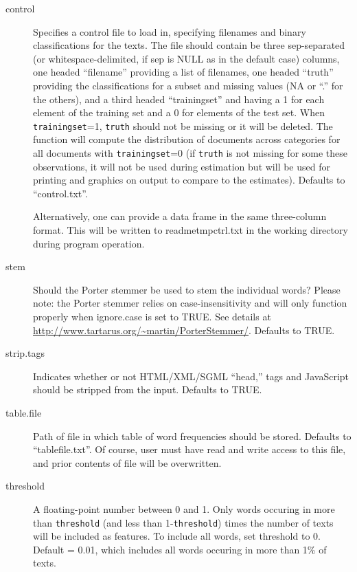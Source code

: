 \documentclass[oneside,letterpaper,titlepage]{article}
\begin{document}
\begin{description}
\item[control] Specifies a control file to load in, specifying
  filenames and binary classifications for the texts. The file should
  contain be three sep-separated (or whitespace-delimited, if sep is
  NULL as in the default case) columns, one headed ``filename''
  providing a list of filenames, one headed ``truth'' providing the
  classifications for a subset and missing values (NA or ``.'' for the
  others), and a third headed ``trainingset'' and having a 1 for each
  element of the training set and a 0 for elements of the test set.
  When \texttt{trainingset}=1, \texttt{truth} should not be missing or
  it will be deleted.  The function will compute the distribution of
  documents across categories for all documents with
  \texttt{trainingset}=0 (if \texttt{truth} is not missing for some
  these observations, it will not be used during estimation but will
  be used for printing and graphics on output to compare to the
  estimates).  Defaults to ``control.txt''.
  
  Alternatively, one can provide a data frame in the same three-column
  format. This will be written to readmetmpctrl.txt in the working
  directory during program operation.
  
\item[stem] Should the Porter stemmer be used to stem the individual
  words? Please note: the Porter stemmer relies on case-insensitivity
  and will only function properly when ignore.case is set to TRUE. See
  details at \url{http://www.tartarus.org/~martin/PorterStemmer/}.
  Defaults to TRUE.

\item[strip.tags] Indicates whether or not HTML/XML/SGML ``head,''
  tags and JavaScript should be stripped from the input. Defaults to
  TRUE.

\item[table.file] Path of file in which table of word frequencies
  should be stored. Defaults to ``tablefile.txt''. Of course, user
  must have read and write access to this file, and prior contents of
  file will be overwritten.
  
\item[threshold] A floating-point number between 0 and 1.  Only words
  occuring in more than \texttt{threshold} (and less than
  1-\texttt{threshold}) times the number of texts will be included as
  features. To include all words, set threshold to 0.  Default = 0.01,
  which includes all words occuring in more than 1\% of texts.


\end{description}
\end{document}
